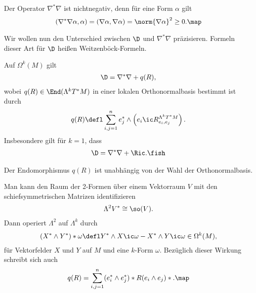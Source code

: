 \documentclass[%
	paper=a5,%
	fleqn,%
	DIV=18,%
	BCOR=0mm,
	fontsize=11pt,
	titlepage=false,%
	bibliography=totoc,
	DIV=18,%
	twoside=true,
	pdftitle=Riemannsche Geometrie,
	pdfauthor=Uwe Semmelmann,
	numbers=noendperiod]%
	{scrbook}
\begin{document}
\begin{rem}
Der Operator $\nabla^*\nabla$ ist nichtnegativ, denn für eine Form $\alpha$ gilt
\begin{align*}
(\nabla^* \nabla\alpha,\alpha)  =
(\nabla\alpha,\nabla\alpha)  = \norm{\nabla\alpha}^2 \ge0.\map
\end{align*}
\end{rem}

Wir wollen nun den Unterschied zwischen $\D$ und $\nabla^*\nabla$ präzisieren. Formeln dieser Art für $\D$ heißen Weitzenböck-Formeln.


\begin{prop}
Auf $\Omega^k(M)$ gilt
\begin{align*}
\D = \nabla^*\nabla + q(R),
\end{align*}
wobei $q(R)\in\End(\Lambda^kT^*M)$ in einer lokalen Orthonormalbasis bestimmt ist durch
\begin{align*}
q(R) \defl \sum_{i,j=1}^n e_{j}^*\wedge \left(e_{i} \ic R_{e_{i},e_{j}}^{\Lambda^k T^*M}\right).
\end{align*}
Insbesondere gilt für $k=1$, dass
\begin{align*}
\D = \nabla^*\nabla + \Ric.\fish
\end{align*}
\end{prop}


\begin{rem}[Bemerkungen.]
\begin{remenum}
\item Der Endomorphismus $q(R)$ ist unabhängig von der Wahl der Orthonormalbasis.
\item 
Man kann den Raum der 2-Formen über einem Vektorraum $V$ mit den schiefsymmetrischen Matrizen identifizieren
\begin{align*}
\Lambda^2 V^* \cong \so(V).
\end{align*}
Dann operiert $\Lambda^2$ auf $\Lambda^k$ durch
\begin{align*}
(X^*\wedge Y^*)* \omega \defl Y^*\wedge X \ic \omega - X^* \wedge Y\ic \omega \in\Omega^k(M),
\end{align*}
für Vektorfelder $X$ und $Y$ auf $M$ und eine $k$-Form $\omega$. Bezüglich dieser Wirkung schreibt sich auch
\begin{align*}
q(R) = \sum_{i,j=1}^n (e_{i}^*\wedge e_{j}^*)* R(e_{i}\wedge e_{j})*.\map
\end{align*}
\end{remenum}
\end{rem}
\end{document}
